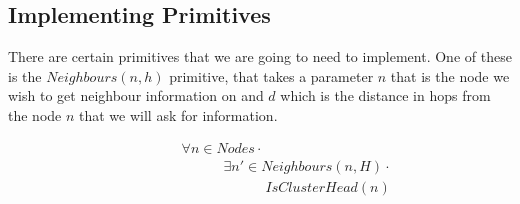 \subsection{Implementing Primitives}

There are certain primitives that we are going to need to implement. One of these is the $Neighbours(n, h)$ primitive, that takes a parameter $n$ that is the node we wish to get neighbour information on and $d$ which is the distance in hops from the node $n$ that we will ask for information.

\begin{align}
\label{eq:hcluster-neighbours-predicate}
& \hspace{3em}	\forall n \in Nodes \cdot \\
& \hspace{6em}		\exists n' \in Neighbours(n, H) \cdot \\
& \hspace{9em}			IsClusterHead(n)
\end{align}

